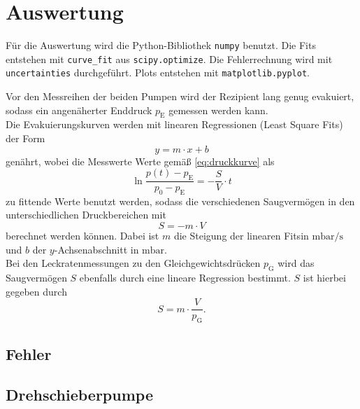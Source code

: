 \section{Auswertung}
\label{sec:Auswertung}

Für die Auswertung wird die Python-Bibliothek \texttt{numpy} benutzt. Die Fits entstehen mit \texttt{curve\_fit} aus \texttt{scipy.optimize}.
Die Fehlerrechnung wird mit \texttt{uncertainties} durchgeführt. Plots entstehen mit \texttt{matplotlib.pyplot}.

Vor den Messreihen der beiden Pumpen wird der Rezipient lang genug evakuiert, sodass ein angenäherter Enddruck $p_\text{E}$ gemessen werden kann. \\
Die Evakuierungskurven werden mit linearen Regressionen (Least Square Fits) der Form
\begin{equation}
    y = m \cdot x + b
\end{equation}
genährt, wobei die Messwerte Werte gemäß \eqref{eq:druckkurve} als
\begin{equation}
    \ln{\frac{p(t) - p_\text{E}}{p_0 - p_\text{E}}} = -\frac{S}{V} \cdot t
    \label{eq:linfit}
\end{equation}
zu fittende Werte benutzt werden, sodass die verschiedenen Saugvermögen in den unterschiedlichen Druckbereichen mit
\begin{equation}
    S = -m \cdot V
    \label{eq:S_evak}
\end{equation}
berechnet werden können. Dabei ist $m$ die Steigung der linearen Fitsin $\si{\milli\bar\per\second}$ und $b$ der $y$-Achsenabschnitt in $\si{\milli\bar}$.\\
Bei den Leckratenmessungen zu den Gleichgewichtsdrücken $p_\text{G}$ wird das Saugvermögen $S$ ebenfalls durch eine lineare Regression bestimmt.
$S$ ist hierbei gegeben durch
\begin{equation}
    S = m \cdot \frac{V}{p_\text{G}}.
    \label{eq:S_leck}
\end{equation}

\subsection{Fehler}



\subsection{Drehschieberpumpe}

